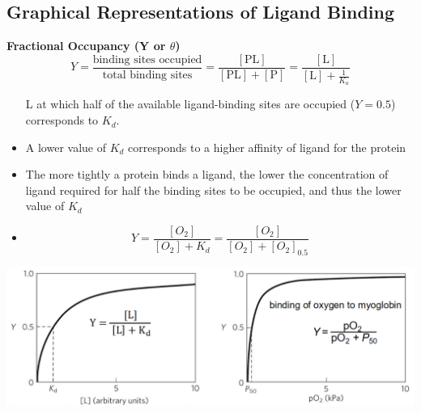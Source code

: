 \documentclass[10pt]{article}
\begin{document}
\subsection*{Graphical Representations of Ligand Binding}
\textbf{Fractional Occupancy (Y or $\theta$)}
\[Y = \frac{\text{binding sites occupied}}{\text{total binding sites}} = \frac{[\text{PL}]}{[\text{PL}] + [\text{P}]} = \frac{[\text{L}]}{[\text{L}] + \frac{1}{K_a}}\]
\begin{itemize}
    \item [L] at which half of the available ligand-binding sites are occupied ($Y = 0.5$) corresponds to $K_d$.
    \item A lower value of $K_d$ corresponds to a higher affinity of ligand for the protein
    \item The more tightly a protein binds a ligand, the lower the concentration of ligand required for half the binding sites to be occupied, and thus the lower value of $K_d$
    \item \[Y = \frac{[O_2]}{[O_2] + K_d} = \frac{[O_2]}{[O_2] + [O_2]_0.5}\]
\end{itemize}
\begin{center}
    \includegraphics*[width=\textwidth]{L3_1.png}
\end{center}
\end{document}
